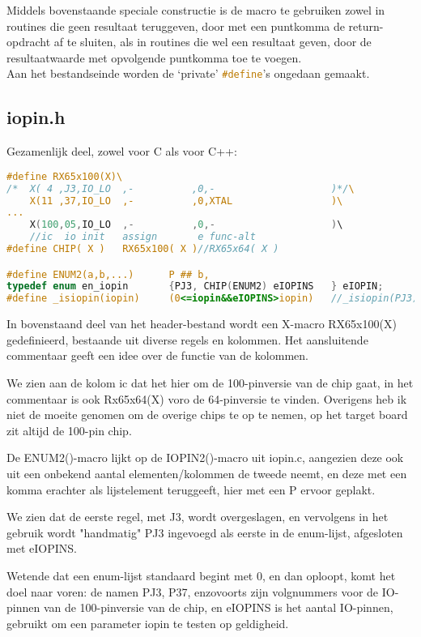 \documentclass[a4paper, 11pt, fleqn, twoside]{scrartcl}%
\begin{document}
Middels bovenstaande speciale constructie is de macro te gebruiken zowel in 
routines die geen resultaat teruggeven, door met een puntkomma de 
return-opdracht af te sluiten, als in routines die wel een resultaat geven, 
door de resultaatwaarde met opvolgende puntkomma toe te voegen.\\

Aan het bestandseinde worden de `private' \lstinline[language=C]!#define!'s 
ongedaan gemaakt.

\subsection{iopin.h}
Gezamenlijk deel, zowel voor C als voor C++:

\begin{lstlisting}[language=C,backgroundcolor=\color{orange!10},framerule=0pt,columns=fixed]
#define RX65x100(X)\
/*	X( 4 ,J3,IO_LO	,-			,0,-					)*/\
	X(11 ,37,IO_LO	,-			,0,XTAL					)\
...
	X(100,05,IO_LO	,-			,0,-					)\
	//ic  io init	assign		 e func-alt
#define CHIP( X )	RX65x100( X )//RX65x64( X )

#define ENUM2(a,b,...)		P ## b,
typedef enum en_iopin		{PJ3, CHIP(ENUM2) eIOPINS	} eIOPIN;
#define _isiopin(iopin)		(0<=iopin&&eIOPINS>iopin)	//_isiopin(PJ3) => 1
\end{lstlisting}

In bovenstaand deel van het header-bestand wordt een X-macro RX65x100(X) 
gedefinieerd, bestaande uit diverse regels en kolommen.
Het aansluitende commentaar geeft een idee over de functie van de kolommen.

We zien aan de kolom ic dat het hier om de 100-pinversie van de chip gaat, 
in het commentaar is ook Rx65x64(X) voro de 64-pinversie te vinden.
Overigens heb ik niet de moeite genomen om de overige chips
te op te nemen, op het target board zit altijd de 100-pin chip.

De ENUM2()-macro lijkt op de IOPIN2()-macro uit iopin.c, aangezien deze ook
uit een onbekend aantal elementen/kolommen de tweede neemt, en deze met een 
komma erachter als lijstelement teruggeeft, hier met een P ervoor geplakt.

We zien dat de eerste regel, met J3, wordt overgeslagen, en vervolgens in het
gebruik wordt "handmatig" PJ3 ingevoegd als eerste in de enum-lijst, afgesloten
met eIOPINS.

Wetende dat een enum-lijst standaard begint met 0, en dan oploopt, komt het doel
naar voren: de namen PJ3, P37, enzovoorts zijn volgnummers voor de IO-pinnen van
de 100-pinversie van de chip, en eIOPINS is het aantal IO-pinnen, gebruikt om
een parameter iopin te testen op geldigheid.
\end{document}

